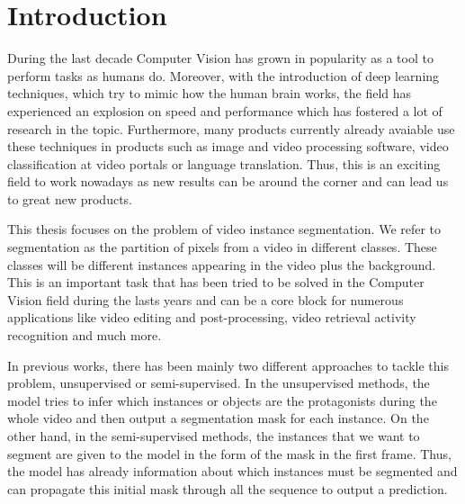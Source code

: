 
%


\chapter{Introduction}
\label{cha:introduction}

During the last decade Computer Vision has grown in popularity as a tool to perform tasks as humans do.
Moreover, with the introduction of deep learning techniques, which try to mimic how the human brain works, the field has experienced an explosion on speed and performance which has fostered a lot of research in the topic.
Furthermore, many products currently already avaiable use these techniques in products such as image and video processing software, video classification at video portals or language translation.
Thus, this is an exciting field to work nowadays as new results can be around the corner and can lead us to great new products.


This thesis focuses on the problem of video instance segmentation.
We refer to segmentation as the partition of pixels from a video in different classes.
These classes will be different instances appearing in the video plus the background.
This is an important task that has been tried to be solved in the Computer Vision field during the lasts years and can be a core block for numerous applications like video editing and post-processing, video retrieval activity recognition and much more.

In previous works, there has been mainly two different approaches to tackle this problem, unsupervised or semi-supervised.
In the unsupervised methods, the model tries to infer which instances or objects are the protagonists during the whole video and then output a segmentation mask for each instance.
On the other hand, in the semi-supervised methods, the instances that we want to segment are given to the model in the form of the mask in the first frame.
Thus, the model has already information about which instances must be segmented and can propagate this initial mask through all the sequence to output a prediction.

